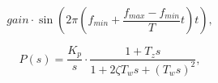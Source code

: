 \documentclass{article}
\begin{document}
\[ gain\cdot\sin\left(2\pi\left(f_{min}+\frac{f_{max}-f_{min}}{T}t\right)t\right), \]
\pagebreak

\[ P\left(s\right)=\frac{K_p}{s}\cdot\frac{1+T_zs}{1+2\zeta T_ws+\left(T_ws\right)^2}, \]
\pagebreak
\end{document}
